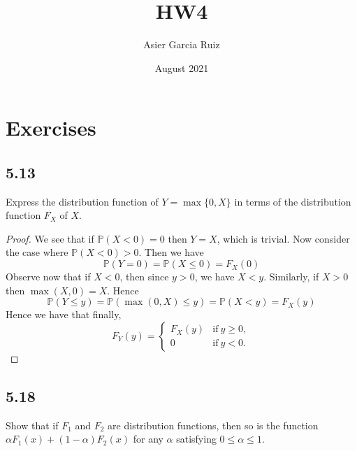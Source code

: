 \documentclass{article}
\title{HW4}
\author{Asier Garcia Ruiz }
\date{August 2021}
\renewcommand{\P}[1]{\mathbb{P}(#1)}
\begin{document}
\maketitle

\section*{Exercises}
\subsection*{5.13} %
Express the distribution function of $Y=\max\{0,X\}$ in terms of the distribution
function $F_X$ of $X$.

\begin{proof}
    We see that if $\P{X < 0} = 0$ then $Y=X$, which is trivial.
    Now consider the case where $\P{X < 0} > 0$. Then we have
    \begin{equation*}
        \P{Y = 0} = \P{X \leq 0}  = F_X(0)
    \end{equation*}
    Observe now that if $X < 0$, then since $y > 0$, we have $X < y$.
    Similarly, if $X > 0$ then $\max(X,0) = X$. Hence
    \begin{equation}
        \P{Y \leq y} = \P{\max(0,X) \leq y} = \P{X < y} = F_X(y)
    \end{equation}
    Hence we have that finally,
    \begin{equation}
        F_Y(y) = \begin{cases}
            F_X(y) & \text{if} \ y \geq 0, \\
            0      & \text{if} \ y < 0.
        \end{cases}
    \end{equation}
\end{proof}

\subsection*{5.18} %
Show that if $F_1$ and $F_2$ are distribution functions, then so is the
function ${\alpha F_1(x) + (1-\alpha) F_2(x)}$ for any $\alpha$ satisfying
$0\leq \alpha \leq 1$.
\end{document}
